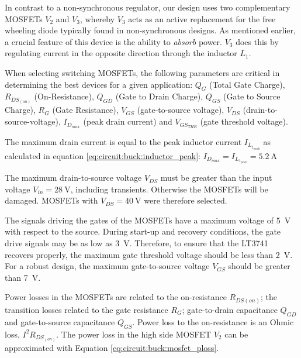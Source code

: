 In contrast to a non-synchronous  regulator, our design uses two complementary
MOSFETs $V_2$ and  $V_3$, whereby $V_3$ acts as an  active replacement for the
free wheeling  diode typically found in  non-synchronous designs. As mentioned
earlier, a  crucial feature  of this  device is  the ability  to \emph{absorb}
power.   $V_3$ does  this  by  regulating current  in  the opposite  direction
through the inductor $L_1$.

When  selecting  switching  MOSFETs,  the  following  parameters are critical in
determining the best devices for a given application: $Q_G$ (Total Gate Charge),
$R_{DS_{(on)}}$ (On-Resistance), $Q_{GD}$ (Gate to Drain Charge), $Q_{GS}$ (Gate
to Source  Charge),  $R_G$ (Gate Resistance), $V_{GS}$ (gate-to-source voltage),
$V_{DS}$  (drain-to-source-voltage),  $I_{D_{max}}$  (peak  drain  current)  and
$V_{GS_{THR}}$ (gate threshold voltage).

The     maximum     drain     current     is     equal     to     the     peak
inductor    current    $I_{L_{1_{peak}}}$    as   calculated    in    equation
\ref{eq:circuit:buck:inductor_peak}: $I_{D_{max}}    =   I_{L_{1_{peak}}}    =
\SI{5.2}{\ampere}$


The maximum  drain-to-source voltage $V_{DS}$  must be greater than  the input
voltage  $V_{in}  =  \SI{28}{\volt}$,  including  transients.   Otherwise  the
MOSFETs will be damaged. MOSFETs with $V_{DS} = \SI{40}{\volt}$ were therefore
selected.

The  signals driving  the  gates of  the  MOSFETs have  a  maximum voltage  of
\SI{5}{\volt}  with  respect to  the  source.   During start-up  and  recovery
conditions, the gate drive signals  may be as low as \SI{3}{\volt}. Therefore,
to  ensure that  the  LT3741  recovers properly,  the  maximum gate  threshold
voltage should  be less than  \SI{2}{\volt}. For a robust design,  the maximum
gate-to-source voltage $V_{GS}$ should be greater than \SI{7}{\volt}.

Power losses in  the MOSFETs are related to  the on-resistance $R_{DS{(on)}}$;
the  transition losses  related to  the gate  resistance $R_G$;  gate-to-drain
capacitance  $Q_{GD}$  and  gate-to-source  capacitance  $Q_{GS}$. Power  loss
to  the  on-resistance  is  an  Ohmic  loss,  $I^2  R_{DS_{(on)}}$. The  power
loss  in  the  high  side  MOSFET $V_2$  can  be  approximated  with  Equation
\ref{eq:circuit:buck:mosfet_ploss}.

